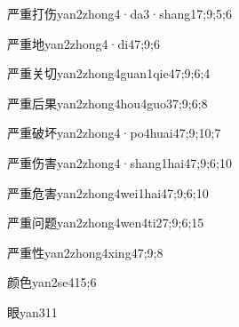 \begin{verbete}{严重打伤}{yan2zhong4·da3·shang1}{7;9;5;6}
\end{verbete}

\begin{verbete}{严重地}{yan2zhong4·di4}{7;9;6}
\end{verbete}

\begin{verbete}{严重关切}{yan2zhong4guan1qie4}{7;9;6;4}
\end{verbete}

\begin{verbete}{严重后果}{yan2zhong4hou4guo3}{7;9;6;8}
\end{verbete}

\begin{verbete}{严重破坏}{yan2zhong4·po4huai4}{7;9;10;7}
\end{verbete}

\begin{verbete}{严重伤害}{yan2zhong4·shang1hai4}{7;9;6;10}
\end{verbete}

\begin{verbete}{严重危害}{yan2zhong4wei1hai4}{7;9;6;10}
\end{verbete}

\begin{verbete}{严重问题}{yan2zhong4wen4ti2}{7;9;6;15}
\end{verbete}

\begin{verbete}{严重性}{yan2zhong4xing4}{7;9;8}
\end{verbete}

\begin{verbete}{颜色}{yan2se4}{15;6}
\end{verbete}

\begin{verbete}{眼}{yan3}{11}
\end{verbete}

